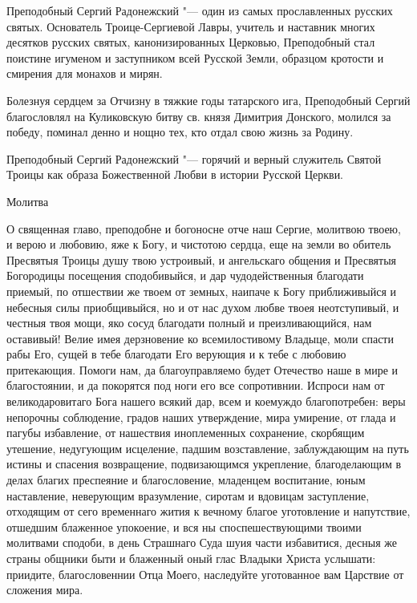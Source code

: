 \bigskip\bigskip\mychapterending

 

Преподобный Сергий Радонежский "--- один из самых прославленных русских святых. Основатель Троице-Сергиевой Лавры, учитель и наставник многих десятков русских святых, канонизированных Церковью, Преподобный стал поистине игуменом и заступником всей Русской Земли, образцом кротости и смирения для монахов и мирян.

Болезнуя сердцем за Отчизну в тяжкие годы татарского ига, Преподобный Сергий благословлял на Куликовскую битву св. князя Димитрия Донского, молился за победу, поминал денно и нощно тех, кто отдал свою жизнь за Родину.




Преподобный Сергий Радонежский "--- горячий и верный служитель Святой Троицы как образа Божественной Любви в истории Русской Церкви.


\medskip


\bfseries 
\normalfont{}

Молитва


О священная главо, преподобне и богоносне отче наш Сергие, молитвою твоею, и верою и любовию, яже к Богу, и чистотою сердца, еще на земли во обитель Пресвятыя Троицы душу твою устроивый, и ангельскаго общения и Пресвятыя Богородицы посещения сподобивыйся, и дар чудодейственныя благодати приемый, по отшествии же твоем от земных, наипаче к Богу приближивыйся и небесныя силы приобщивыйся, но и от нас духом любве твоея неотступивый, и честныя твоя мощи, яко сосуд благодати полный и преизливающийся, нам оставивый! Велие имея дерзновение ко всемилостивому Владыце, моли спасти рабы Его, сущей в тебе благодати Его верующия и к тебе с любовию притекающия. Помоги нам, да благоуправляемо будет Отечество наше в мире и благостоянии, и да покорятся под ноги его все сопротивнии. Испроси нам от великодаровитаго Бога нашего всякий дар, всем и коемуждо благопотребен: веры непорочны соблюдение, градов наших утверждение, мира умирение, от глада и пагубы избавление, от нашествия иноплеменных сохранение, скорбящим утешение, недугующим исцеление, падшим возставление, заблуждающим на путь истины и спасения возвращение, подвизающимся укрепление, благоделающим в делах благих преспеяние и благословение, младенцем воспитание, юным наставление, неверующим вразумление, сиротам и вдовицам заступление, отходящим от сего временнаго жития к вечному благое уготовление и напутствие, отшедшим блаженное упокоение, и вся ны споспешествующими твоими молитвами сподоби, в день Страшнаго Суда шуия части избавитися, десныя же страны общники быти и блаженный оный глас Владыки Христа услышати: приидите, благословеннии Отца Моего, наследуйте уготованное вам Царствие от сложения мира.


